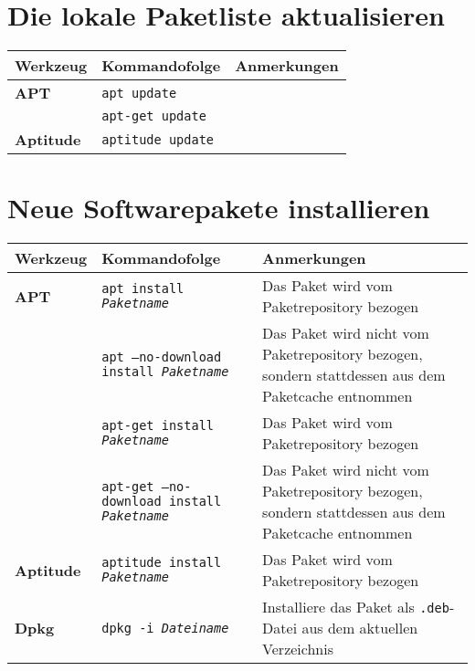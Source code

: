 \documentclass[10pt,a4paper]{article}
\begin{document}
\cheatsheet

\section{Die lokale Paketliste aktualisieren}

\begin{tabular}{ p{3.5cm} p{9.6cm} p{11cm}}
  \hline
  \rowcolor{Gray}
  \textbf{Werkzeug} & \textbf{Kommandofolge} & \textbf{Anmerkungen} \\
  \hline 
  \textbf{APT} & \texttt{apt update} & \\
  \rowcolor{Gray}
  & \texttt{apt-get update} & \\
  \textbf{Aptitude} & \texttt{aptitude update} & \\
  \hline 
\end{tabular}

\section{Neue Softwarepakete installieren}
\begin{tabular}{ p{3.5cm} p{9.6cm} p{11cm}}
  \hline
  \rowcolor{Gray}
  \textbf{Werkzeug} & \textbf{Kommandofolge} & \textbf{Anmerkungen} \\
  \hline 
  \textbf{APT} & \texttt{apt install \textit{Paketname}} & Das Paket wird vom Paketrepository bezogen \\
  \rowcolor{Gray}
   & \texttt{apt --no-download install \textit{Paketname}} & Das Paket wird nicht vom Paketrepository bezogen, sondern statt\-dessen aus dem Paketcache entnommen \\ 
   & \texttt{apt-get install \textit{Paketname}} & Das Paket wird vom Paketrepository bezogen \\
  \rowcolor{Gray}
   & \texttt{apt-get --no-download install \textit{Paketname}} & Das Paket wird nicht vom Paketrepository bezogen, sondern statt\-dessen aus dem Paketcache entnommen \\
  \textbf{Aptitude} & \texttt{aptitude install \textit{Paketname}} & Das Paket wird vom Paketrepository bezogen \\
  \rowcolor{Gray}
  \textbf{Dpkg} & \texttt{dpkg -i \textit{Dateiname}} & Installiere das Paket als \texttt{.deb}-Datei aus dem aktuellen Verzeichnis \\
  \hline
\end{tabular}
\end{document}
